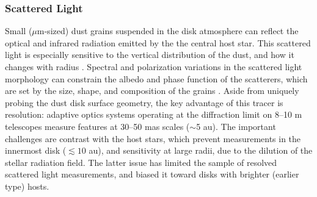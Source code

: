 \documentclass[a4paper]{ar-1col}
\begin{document}
\subsubsection{Scattered Light}
Small ($\mu$m-sized) dust grains suspended in the disk atmosphere can reflect the optical and infrared radiation emitted by the the central host star.  This scattered light is especially sensitive to the vertical distribution of the dust, and how it changes with radius \citep[e.g.,][]{debes13,stolker16,garufi17}.  Spectral and polarization variations in the scattered light morphology can constrain the albedo and phase function of the scatterers, which are set by the size, shape, and composition of the grains \citep{debes08,min12,min16}.  Aside from uniquely probing the dust disk surface geometry, the key advantage of this tracer is resolution: adaptive optics systems operating at the diffraction limit on 8--10 m telescopes measure features at 30--50 mas scales ($\sim$5 au).  The important challenges are contrast with the host stars, which prevent measurements in the innermost disk ($\lesssim 10$ au), and sensitivity at large radii, due to the dilution of the stellar radiation field.  The latter issue has limited the sample of resolved scattered light measurements, and biased it toward disks with brighter (earlier type) hosts.    

\end{document}
